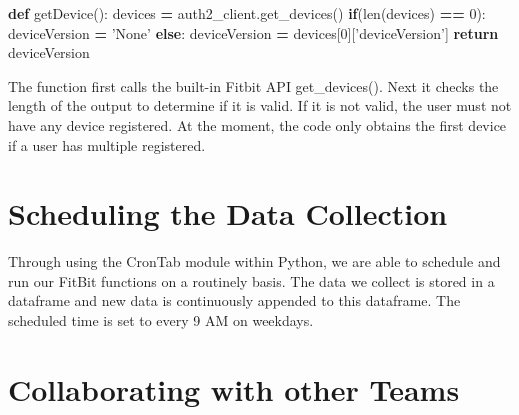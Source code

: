 \documentclass[]{book}
\newenvironment{Shaded}{\begin{snugshade}}{\end{snugshade}}
\newcommand{\BuiltInTok}[1]{#1}
\newcommand{\ControlFlowTok}[1]{\textcolor[rgb]{0.13,0.29,0.53}{\textbf{#1}}}
\newcommand{\DecValTok}[1]{\textcolor[rgb]{0.00,0.00,0.81}{#1}}
\newcommand{\KeywordTok}[1]{\textcolor[rgb]{0.13,0.29,0.53}{\textbf{#1}}}
\newcommand{\NormalTok}[1]{#1}
\newcommand{\OperatorTok}[1]{\textcolor[rgb]{0.81,0.36,0.00}{\textbf{#1}}}
\newcommand{\StringTok}[1]{\textcolor[rgb]{0.31,0.60,0.02}{#1}}
\begin{document}
\begin{Shaded}
\begin{Highlighting}[]
\KeywordTok{def}\NormalTok{ getDevice():}
\NormalTok{    devices }\OperatorTok{=}\NormalTok{ auth2_client.get_devices()}
    \ControlFlowTok{if}\NormalTok{(}\BuiltInTok{len}\NormalTok{(devices) }\OperatorTok{==} \DecValTok{0}\NormalTok{):}
\NormalTok{        deviceVersion }\OperatorTok{=} \StringTok{'None'}
    \ControlFlowTok{else}\NormalTok{:}
\NormalTok{        deviceVersion }\OperatorTok{=}\NormalTok{ devices[}\DecValTok{0}\NormalTok{][}\StringTok{'deviceVersion'}\NormalTok{]    }
    \ControlFlowTok{return}\NormalTok{ deviceVersion}
\end{Highlighting}
\end{Shaded}

The function first calls the built-in Fitbit API get\_devices(). Next it checks the length of the output to determine if it is valid. If it is not valid, the user must not have any device registered. At the moment, the code only obtains the first device if a user has multiple registered.

\hypertarget{scheduling-the-data-collection}{%
\section{Scheduling the Data Collection}\label{scheduling-the-data-collection}}

Through using the CronTab module within Python, we are able to schedule and run our FitBit functions on a routinely basis. The data we collect is stored in a dataframe and new data is continuously appended to this dataframe. The scheduled time is set to every 9 AM on weekdays.

\hypertarget{collaborating-with-other-teams}{%
\section{Collaborating with other Teams}\label{collaborating-with-other-teams}}
\end{document}
